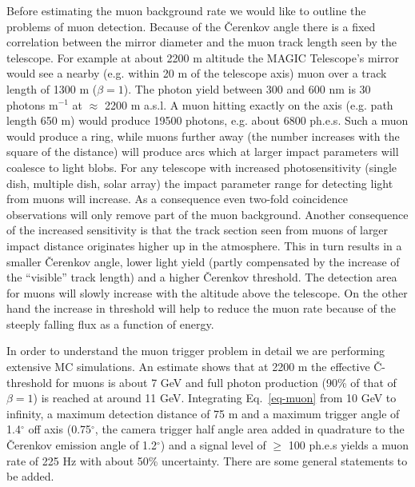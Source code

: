 Before estimating the muon background rate we would like to outline the
problems of muon detection. Because of the \v{C}erenkov angle there is a fixed
correlation between the mirror diameter and the muon track length seen by
the telescope. For example at about 2200 m altitude the MAGIC Telescope's mirror would
see a nearby (e.g. within 20 m of the telescope axis) muon over a track
length of 1300 m ($\beta = 1$). The photon yield between 300 and 600 nm is
30 photons m$^{-1}$ at $\approx$ 2200 m a.s.l. A muon hitting exactly on the axis (e.g. path length
650 m) would produce 19500 photons, e.g. about 6800 ph.e.s. Such a muon would
produce a ring, while muons further away (the number increases with the
square of the distance) will produce arcs which at larger impact parameters
will coalesce to light blobs. For any telescope with increased
photosensitivity (single dish, multiple dish, solar array) the 
impact parameter range for
detecting light from muons will increase. As a consequence even 
two-fold coincidence
observations will only remove part of the muon background. Another
consequence of the increased sensitivity is that the track section seen from
muons of larger impact distance  originates higher up in the atmosphere. This
in turn results in a smaller \v{C}erenkov angle, lower light yield (partly
compensated by the increase of the ``visible'' track length) and a higher \v{C}erenkov
threshold. The detection area for muons will slowly increase with the altitude
above the telescope. 
On the other hand the increase in threshold will help
to reduce the muon rate because of the steeply falling flux as a function of
energy.

In order to understand the muon trigger problem in detail we are performing
extensive MC
simulations. 
An estimate shows that at 2200 m 
the effective \v{C}-threshold for muons is
about 7 GeV and full photon production (90\% of that of $\beta = 1$) is
reached at around 11 GeV. Integrating Eq.~\ref{eq-muon} from 10 GeV to infinity,
a maximum detection distance of 75 m and a maximum trigger angle of 1.4$%
^\circ$ off axis (0.75$^\circ$, the camera trigger half angle area added in
quadrature to the \v{C}erenkov emission angle of 1.2$^\circ$) and a signal level
of $\geq$ 100 ph.e.s yields a muon rate of 225 Hz with about 50\% uncertainty.
There are some general statements to be added.

